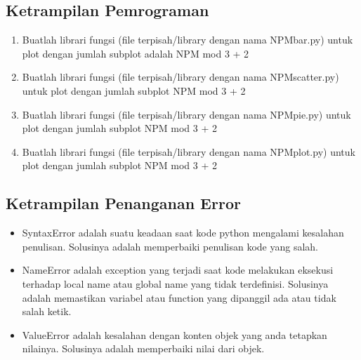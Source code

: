 \subsection{Ketrampilan Pemrograman}
\begin{enumerate}
    \item Buatlah librari fungsi (file terpisah/library dengan nama NPMbar.py) untuk plot dengan jumlah subplot adalah NPM mod 3 + 2
    
    
    \item Buatlah librari fungsi (file terpisah/library dengan nama NPMscatter.py) untuk plot dengan jumlah subplot NPM mod 3 + 2
    
    
    \item Buatlah librari fungsi (file terpisah/library dengan nama NPMpie.py) untuk plot dengan jumlah subplot NPM mod 3 + 2
    
    
    \item Buatlah librari fungsi (file terpisah/library dengan nama NPMplot.py) untuk plot dengan jumlah subplot NPM mod 3 + 2
    
\end{enumerate}

\subsection{Ketrampilan Penanganan Error}
\begin{itemize}
    \item SyntaxError adalah suatu keadaan saat kode python mengalami kesalahan penulisan. Solusinya adalah memperbaiki penulisan kode yang salah.
    
    \item NameError adalah exception yang terjadi saat kode melakukan eksekusi terhadap local name atau global name yang tidak terdefinisi. Solusinya adalah memastikan variabel atau function yang dipanggil ada atau tidak salah ketik.
    
    \item ValueError adalah kesalahan dengan konten objek yang anda tetapkan nilainya. Solusinya adalah memperbaiki nilai dari objek.
    
\end{itemize}
